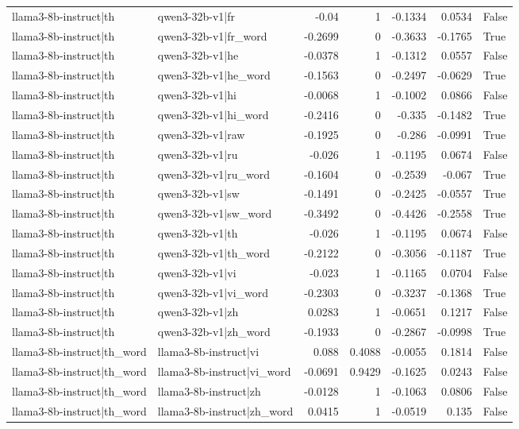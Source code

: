 \begin{table}
\begin{tabular}{l l r r r r l}
llama3-8b-instruct|th & qwen3-32b-v1|fr & -0.04 & 1 & -0.1334 & 0.0534 & False \\
llama3-8b-instruct|th & qwen3-32b-v1|fr_word & -0.2699 & 0 & -0.3633 & -0.1765 & True \\
llama3-8b-instruct|th & qwen3-32b-v1|he & -0.0378 & 1 & -0.1312 & 0.0557 & False \\
llama3-8b-instruct|th & qwen3-32b-v1|he_word & -0.1563 & 0 & -0.2497 & -0.0629 & True \\
llama3-8b-instruct|th & qwen3-32b-v1|hi & -0.0068 & 1 & -0.1002 & 0.0866 & False \\
llama3-8b-instruct|th & qwen3-32b-v1|hi_word & -0.2416 & 0 & -0.335 & -0.1482 & True \\
llama3-8b-instruct|th & qwen3-32b-v1|raw & -0.1925 & 0 & -0.286 & -0.0991 & True \\
llama3-8b-instruct|th & qwen3-32b-v1|ru & -0.026 & 1 & -0.1195 & 0.0674 & False \\
llama3-8b-instruct|th & qwen3-32b-v1|ru_word & -0.1604 & 0 & -0.2539 & -0.067 & True \\
llama3-8b-instruct|th & qwen3-32b-v1|sw & -0.1491 & 0 & -0.2425 & -0.0557 & True \\
llama3-8b-instruct|th & qwen3-32b-v1|sw_word & -0.3492 & 0 & -0.4426 & -0.2558 & True \\
llama3-8b-instruct|th & qwen3-32b-v1|th & -0.026 & 1 & -0.1195 & 0.0674 & False \\
llama3-8b-instruct|th & qwen3-32b-v1|th_word & -0.2122 & 0 & -0.3056 & -0.1187 & True \\
llama3-8b-instruct|th & qwen3-32b-v1|vi & -0.023 & 1 & -0.1165 & 0.0704 & False \\
llama3-8b-instruct|th & qwen3-32b-v1|vi_word & -0.2303 & 0 & -0.3237 & -0.1368 & True \\
llama3-8b-instruct|th & qwen3-32b-v1|zh & 0.0283 & 1 & -0.0651 & 0.1217 & False \\
llama3-8b-instruct|th & qwen3-32b-v1|zh_word & -0.1933 & 0 & -0.2867 & -0.0998 & True \\
llama3-8b-instruct|th_word & llama3-8b-instruct|vi & 0.088 & 0.4088 & -0.0055 & 0.1814 & False \\
llama3-8b-instruct|th_word & llama3-8b-instruct|vi_word & -0.0691 & 0.9429 & -0.1625 & 0.0243 & False \\
llama3-8b-instruct|th_word & llama3-8b-instruct|zh & -0.0128 & 1 & -0.1063 & 0.0806 & False \\
llama3-8b-instruct|th_word & llama3-8b-instruct|zh_word & 0.0415 & 1 & -0.0519 & 0.135 & False \\

\end{tabular}
\end{table}
